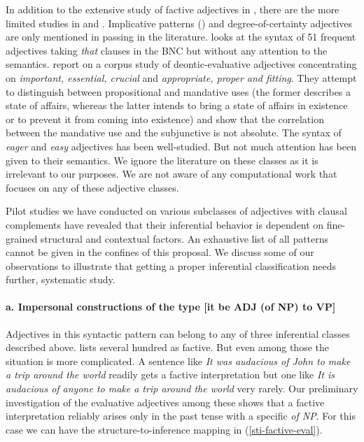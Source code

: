 \documentclass[10pt]{article}
\begin{document}
 
In addition to the extensive study of factive adjectives in \cite{norrick:1978},
there are the more limited studies in \cite{wilkinson:1970} and \cite{barker:2002}. Implicative patterns (\cite{karttunen:1971}) and degree-of-certainty adjectives are only mentioned in passing in the literature. \cite{mindt:2011} looks at the syntax of 51 frequent adjectives taking \emph{that }clauses in the BNC but without any attention to the semantics.\cite{vanlinden+davidse:2009} report on a corpus study of deontic-evaluative adjectives concentrating on \emph{important, essential, crucial} and \emph{appropriate, proper and fitting}. They attempt to distinguish between propositional and mandative uses (the former describes a state of affairs, whereas the latter intends to bring a state of affairs in existence or to prevent it from coming into existence) and show that the correlation between the mandative use and the subjunctive is not absolute. The syntax of  \emph{eager} and \emph{easy} adjectives has been well-studied. But not much attention has been given to their semantics. We ignore the literature on these classes as it is irrelevant to our purposes. We are not aware of any computational work that focuses on any of these adjective classes. 

Pilot studies we have conducted on various subclasses of adjectives with clausal complements have revealed  that their inferential behavior is dependent on fine-grained structural and contextual factors. 
 An exhaustive list of all patterns cannot be given in the confines of this proposal. We discuss some of our observations to illustrate that getting a proper inferential classification  needs further, systematic study.



\vspace{-1.0em}
\paragraph{a. Impersonal constructions of the type [it be ADJ (of NP) to VP]}
 Adjectives in this syntactic pattern can belong to any of three inferential classes described above. 
\cite{norrick:1978} lists several hundred as factive. But even among those 
the situation is more complicated. A sentence like \textit{It was audacious of John to make a trip around the world} readily gets a factive interpretation but one like \textit{It is audacious of anyone to make a trip around the world} very rarely.
Our preliminary investigation of the evaluative adjectives among these shows that a factive interpretation reliably arises only in the past tense with a specific \textit{of NP}. For this case we can have the structure-to-inference mapping in (\ref{sti-factive-eval}).
\end{document}

